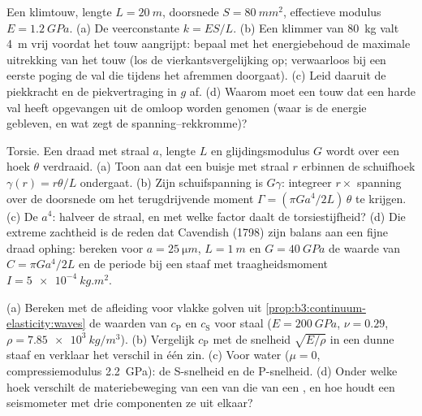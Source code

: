 \begin{exercise}[$\star\star$]\label{exo:b3:continuum-elasticity:7}
Een klimtouw, lengte $L = \qty{20}{m}$, doorsnede $S =
\qty{80}{mm^2}$,
effectieve modulus $E = \qty{1.2}{GPa}$. (a) De veerconstante $k = ES/L$.
(b) Een klimmer van \qty{80}{kg} valt \qty{4}{m} vrij voordat het touw
aangrijpt: bepaal met het energiebehoud de maximale uitrekking van het
touw (los de vierkantsvergelijking op; verwaarloos bij een eerste poging
de val die tijdens het afremmen doorgaat). (c) Leid daaruit de piekkracht
en de piekvertraging in $g$ af. (d) Waarom moet een touw dat een harde
val heeft opgevangen uit de omloop worden genomen (waar is de energie
gebleven, en wat zegt de spanning--rekkromme)?
\end{exercise}

\begin{exercise}[$\star\star$]\label{exo:b3:continuum-elasticity:8}
Torsie. Een draad met straal $a$, lengte $L$ en glijdingsmodulus $G$
wordt over een hoek $\theta$ verdraaid. (a) Toon aan dat een buisje met
straal $r$ erbinnen de schuifhoek $\gamma(r) = r\theta/L$ ondergaat. (b)
Zijn schuifspanning is $G\gamma$: integreer $r \times$ spanning over de
doorsnede om het terugdrijvende moment $\Gamma = (\pi Ga^4/2L)\,\theta$
te krijgen. (c) De $a^4$: halveer de straal, en met welke factor daalt de
torsiestijfheid? (d) Die extreme zachtheid is de reden dat Cavendish
(1798) zijn balans aan een fijne draad ophing: bereken voor $a = \qty{25}{\micro m}$, $L =
\qty{1}{m}$ en $G = \qty{40}{GPa}$ de waarde
van $C = \pi Ga^4/2L$ en de periode bij een staaf met traagheidsmoment
$I = \qty{5e-4}{kg.m^2}$.
\end{exercise}

\begin{exercise}[$\star\star$]\label{exo:b3:continuum-elasticity:9}
(a) Bereken met de afleiding voor vlakke golven uit
\cref{prop:b3:continuum-elasticity:waves} de waarden van $c_{\text{P}}$
en $c_{\text{S}}$ voor staal ($E = \qty{200}{GPa}$, $\nu = 0.29$, $\rho =
\qty{7.85e3}{kg/m^3}$). (b) Vergelijk $c_{\text{P}}$ met de snelheid
$\sqrt{E/\rho}$ in een dunne staaf en verklaar het verschil in één zin.
(c) Voor water ($\mu = 0$, compressiemodulus \qty{2.2}{GPa}): de
S-snelheid en de P-snelheid. (d) Onder welke hoek verschilt de
materiebeweging van een  van die van een , en hoe houdt een
seismometer met drie componenten ze uit elkaar?
\end{exercise}

